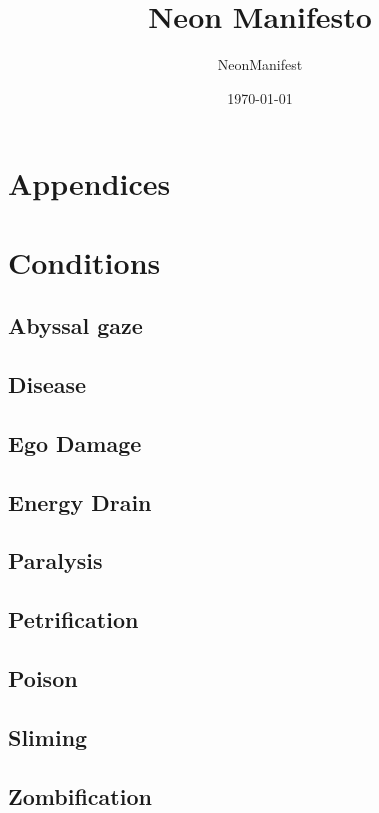 \documentclass{article}
\title{Neon Manifesto}
\author{NeonManifest}
\date{\today}
\begin{document}
\maketitle

\tableofcontents









\appendix
\section*{Appendices}
\section{Conditions}
\label{app:conditions}
\begin{multicols}{3}
    \subsection*{Abyssal gaze}
    \subsection*{Disease}
    \subsection*{Ego Damage}
    \subsection*{Energy Drain}
    \subsection*{Paralysis}
    \subsection*{Petrification}
    \subsection*{Poison}
    \subsection*{Sliming}
    \subsection*{Zombification}
\end{multicols}
\end{document}
